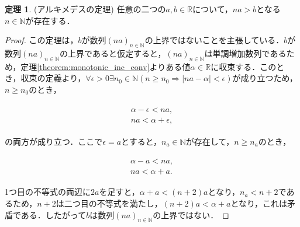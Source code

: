 \documentclass[oneside,openany]{jbook}
\theoremstyle{definition}
\newtheorem{theorem}{定理}
\begin{document}
\begin{theorem}{(アルキメデスの定理)}
任意の二つの$a, b \in \mathbb{R}$について，$na > b$となる$n \in \mathbb{N}$が存在する．
\end{theorem}

\begin{proof}
この定理は，$b$が数列$(na)_{n \in \mathbb{N}}$の上界ではないことを主張している．$b$が数列$(na)_{n \in \mathbb{N}}$の上界であると仮定すると，$(na)_{n \in \mathbb{N}}$は単調増加数列であるため，定理\ref{theorem:monotonic_inc_conv}よりある値$\alpha \in \mathbb{R}$に収束する．このとき，収束の定義より，$\forall \epsilon > 0 \exists  n_{0} \in \mathbb{N} (  n \geq n_{0} \Rightarrow | na - \alpha | < \epsilon )$が成り立つため，$n \geq n_{0}$のとき，

\begin{align}
\begin{split}
\alpha - \epsilon < na,\\
na < \alpha + \epsilon, 
\end{split}
\end{align}

の両方が成り立つ．ここで$\epsilon = a$とすると，$n_{a} \in \mathbb{N}$が存在して，$n \geq n_{a}$のとき，

\begin{align}
\begin{split}
\alpha - a < na,\\
na < \alpha + a.
\end{split}
\end{align}

1つ目の不等式の両辺に$2a$を足すと，$\alpha + a < (n+2)a$となり，$n_{a} < n+2$であるため，$n+2$は二つ目の不等式を満たし，$(n+2)a < \alpha + a$となり，これは矛盾である．したがって$b$は数列$(na)_{n \in \mathbb{N}}$の上界ではない．
\end{proof}
\end{document}
